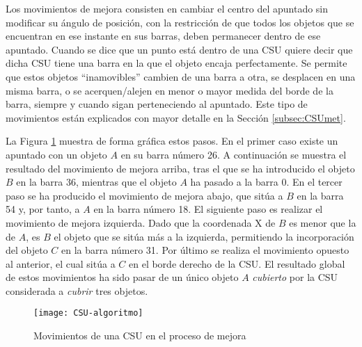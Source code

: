 Los movimientos de mejora consisten en cambiar el centro del apuntado sin
modificar su ángulo de posición, con la restricción de que todos los objetos
que se encuentran en ese instante en sus barras, deben permanecer dentro de ese
apuntado. 
Cuando se dice que un punto está dentro de una CSU quiere decir que
dicha CSU tiene una barra en la que el objeto encaja perfectamente. 
Se permite que estos objetos ``inamovibles'' cambien de una barra a otra, se desplacen en una
misma barra, o se acerquen/alejen en menor o mayor medida del borde de la barra,
siempre y cuando sigan perteneciendo al apuntado. 
Este tipo de movimientos están explicados con mayor detalle en la Sección \ref{subsec:CSUmet}.

La Figura \ref{fig:mejora} muestra de forma gráfica estos pasos. En el primer
caso existe un apuntado con un objeto $A$ en su barra número 26. A continuación
se muestra el resultado del movimiento de mejora arriba, tras el que se ha
introducido el objeto $B$ en la barra 36, mientras que el objeto $A$ ha pasado a la barra 0. 
En el tercer paso se ha producido el movimiento de mejora abajo, que sitúa a $B$ en
la barra 54 y, por tanto, a $A$ en la barra número 18. 
El siguiente paso es realizar el movimiento de mejora izquierda. 
Dado que la coordenada X de $B$ es
menor que la de $A$, es $B$ el objeto que se sitúa más a la izquierda, permitiendo la
incorporación del objeto $C$ en la barra número 31. 
Por último se realiza el movimiento opuesto al anterior, el cual sitúa a $C$ en el borde derecho de la CSU.
El resultado global de estos movimientos ha sido pasar de un único objeto $A$ \textit{cubierto} por la
CSU considerada a \textit{cubrir} tres objetos.

\begin{figure}[!htb]
\centering
\texttt{[image: CSU-algoritmo]}
\caption{Movimientos de una CSU en el proceso de mejora}
\label{fig:mejora}
\end{figure}

